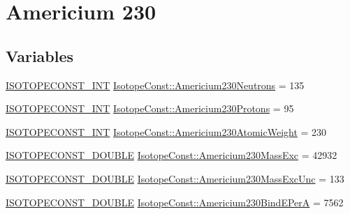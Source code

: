 \hypertarget{group___isotope_const-_americium-_am230}{}\section{Americium 230}
\label{group___isotope_const-_americium-_am230}
\subsection*{Variables}
\begin{DoxyCompactItemize}
\item 
\mbox{\hyperlink{group___isotope_const-_macros_ga5f18360b3e99483a35c32d789e62621c}{I\+S\+O\+T\+O\+P\+E\+C\+O\+N\+S\+T\+\_\+\+I\+NT}} \mbox{\hyperlink{group___isotope_const-_americium-_am230_gac71c01691b8b718ca0b8929709a78748}{Isotope\+Const\+::\+Americium230\+Neutrons}} = 135
\item 
\mbox{\hyperlink{group___isotope_const-_macros_ga5f18360b3e99483a35c32d789e62621c}{I\+S\+O\+T\+O\+P\+E\+C\+O\+N\+S\+T\+\_\+\+I\+NT}} \mbox{\hyperlink{group___isotope_const-_americium-_am230_gaa9c6b761c29b8c9e46f5c3061316e0d5}{Isotope\+Const\+::\+Americium230\+Protons}} = 95
\item 
\mbox{\hyperlink{group___isotope_const-_macros_ga5f18360b3e99483a35c32d789e62621c}{I\+S\+O\+T\+O\+P\+E\+C\+O\+N\+S\+T\+\_\+\+I\+NT}} \mbox{\hyperlink{group___isotope_const-_americium-_am230_ga20e4ea0504f21fb21fbbefb5e35e86b9}{Isotope\+Const\+::\+Americium230\+Atomic\+Weight}} = 230
\item 
\mbox{\hyperlink{group___isotope_const-_macros_ga8f45a7272ce02c0b4c65c44636ed719a}{I\+S\+O\+T\+O\+P\+E\+C\+O\+N\+S\+T\+\_\+\+D\+O\+U\+B\+LE}} \mbox{\hyperlink{group___isotope_const-_americium-_am230_gaa8c6e1cd1aae037053b56e90895d6d0a}{Isotope\+Const\+::\+Americium230\+Mass\+Exc}} = 42932
\item 
\mbox{\hyperlink{group___isotope_const-_macros_ga8f45a7272ce02c0b4c65c44636ed719a}{I\+S\+O\+T\+O\+P\+E\+C\+O\+N\+S\+T\+\_\+\+D\+O\+U\+B\+LE}} \mbox{\hyperlink{group___isotope_const-_americium-_am230_gaa01de32f31188193c79a287f167ff726}{Isotope\+Const\+::\+Americium230\+Mass\+Exc\+Unc}} = 133
\item 
\mbox{\hyperlink{group___isotope_const-_macros_ga8f45a7272ce02c0b4c65c44636ed719a}{I\+S\+O\+T\+O\+P\+E\+C\+O\+N\+S\+T\+\_\+\+D\+O\+U\+B\+LE}} \mbox{\hyperlink{group___isotope_const-_americium-_am230_ga530f85c619d584f6573ef76eebf73960}{Isotope\+Const\+::\+Americium230\+Bind\+E\+PerA}} = 7562
\item 

\end{DoxyCompactItemize}
